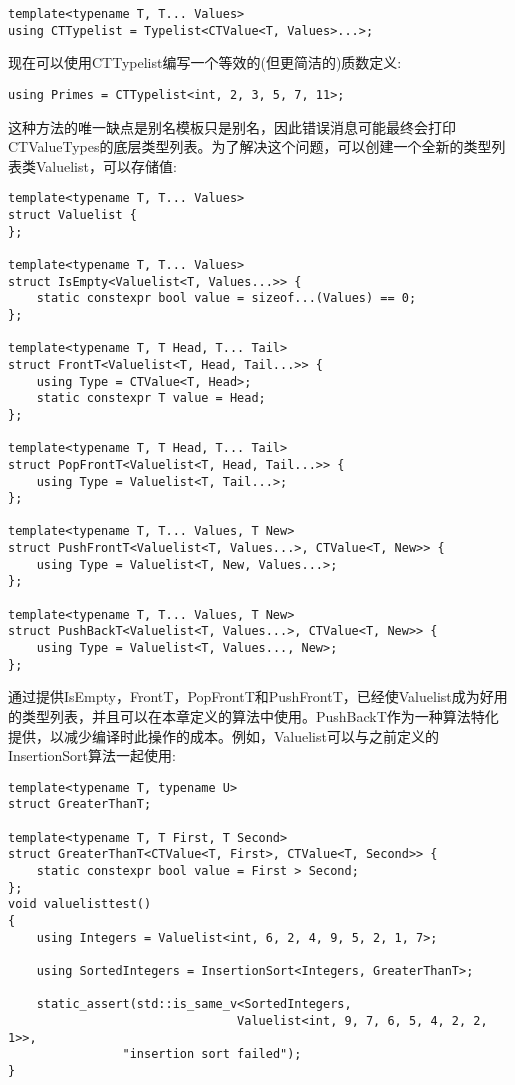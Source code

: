 \begin{lstlisting}[style=styleCXX]
template<typename T, T... Values>
using CTTypelist = Typelist<CTValue<T, Values>...>;
\end{lstlisting}

现在可以使用CTTypelist编写一个等效的(但更简洁的)质数定义:

\begin{lstlisting}[style=styleCXX]
using Primes = CTTypelist<int, 2, 3, 5, 7, 11>;
\end{lstlisting}

这种方法的唯一缺点是别名模板只是别名，因此错误消息可能最终会打印CTValueTypes的底层类型列表。为了解决这个问题，可以创建一个全新的类型列表类Valuelist，可以存储值:

\begin{lstlisting}[style=styleCXX]
template<typename T, T... Values>
struct Valuelist {
};

template<typename T, T... Values>
struct IsEmpty<Valuelist<T, Values...>> {
	static constexpr bool value = sizeof...(Values) == 0;
};

template<typename T, T Head, T... Tail>
struct FrontT<Valuelist<T, Head, Tail...>> {
	using Type = CTValue<T, Head>;
	static constexpr T value = Head;
};

template<typename T, T Head, T... Tail>
struct PopFrontT<Valuelist<T, Head, Tail...>> {
	using Type = Valuelist<T, Tail...>;
};

template<typename T, T... Values, T New>
struct PushFrontT<Valuelist<T, Values...>, CTValue<T, New>> {
	using Type = Valuelist<T, New, Values...>;
};

template<typename T, T... Values, T New>
struct PushBackT<Valuelist<T, Values...>, CTValue<T, New>> {
	using Type = Valuelist<T, Values..., New>;
};
\end{lstlisting}

通过提供IsEmpty，FrontT，PopFrontT和PushFrontT，已经使Valuelist成为好用的类型列表，并且可以在本章定义的算法中使用。PushBackT作为一种算法特化提供，以减少编译时此操作的成本。例如，Valuelist可以与之前定义的InsertionSort算法一起使用:

\begin{lstlisting}[style=styleCXX]
template<typename T, typename U>
struct GreaterThanT;

template<typename T, T First, T Second>
struct GreaterThanT<CTValue<T, First>, CTValue<T, Second>> {
	static constexpr bool value = First > Second;
};
void valuelisttest()
{
	using Integers = Valuelist<int, 6, 2, 4, 9, 5, 2, 1, 7>;
	
	using SortedIntegers = InsertionSort<Integers, GreaterThanT>;
	
	static_assert(std::is_same_v<SortedIntegers,
								Valuelist<int, 9, 7, 6, 5, 4, 2, 2, 1>>,
				"insertion sort failed");
}
\end{lstlisting}

